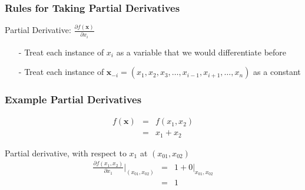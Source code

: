 \documentclass{beamer}
\numberwithin{equation}{section}
\begin{document}
\begin{frame}
\frametitle{Rules for Taking Partial Derivatives}

\alert{Partial Derivative}: $\frac{\partial f(\boldsymbol{x}) }{\partial x_{i} }$ 
\begin{itemize}
\item[-] Treat each instance of $x_{i}$ as a \alert{variable} that we would differentiate before
\item[-] Treat each instance of $\boldsymbol{x}_{-i} = (x_{1}, x_{2} , x_{3} , \hdots, x_{i-1}, x_{i+1}, \hdots, x_{n})$ as a \alert{constant}
\end{itemize}

\end{frame}


\begin{frame}
\frametitle{Example Partial Derivatives} 


\begin{eqnarray}
f(\boldsymbol{x}) & = & f(x_{1}, x_{2}) \nonumber \\
							& = & x_{1} + x_{2}\nonumber 
\end{eqnarray}							

Partial derivative, with respect to $x_{1}$ at $(x_{01}, x_{02})$
\begin{eqnarray}
\frac{\partial f(x_{1}, x_{2} ) } {\partial x_{1} }|_{(x_{01}, x_{02} )} & = &  1 + 0|_{x_{01}, x_{02}}  \nonumber \\
																	& = & 1 \nonumber 
\end{eqnarray}																	


\end{frame}
\end{document}
